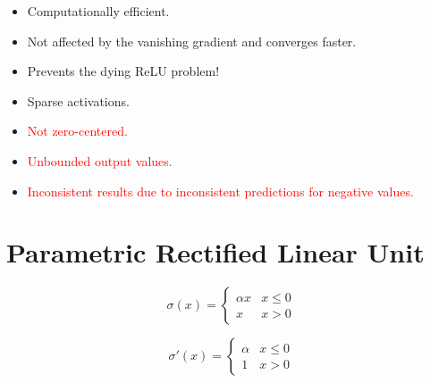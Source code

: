 \documentclass{article}
\begin{document}
\begin{itemize}
  \item Computationally efficient.
  \item Not affected by the vanishing gradient and converges faster.
  \item Prevents the dying ReLU problem!
  \item Sparse activations.
  \item \textcolor{red}{Not zero-centered.}
  \item \textcolor{red}{Unbounded output values.}
  \item \textcolor{red}{Inconsistent results due to inconsistent predictions for negative values.}
\end{itemize}

\clearpage

\section{Parametric Rectified Linear Unit}

\begin{figure}[!htb]
  \centering
\end{figure}

\begin{equation}
  \sigma(x) =
    \begin{cases}
      \alpha x & x \leq 0\\
      x & x > 0
    \end{cases}
\end{equation}

\begin{equation}
  \sigma'(x) =
    \begin{cases}
      \alpha & x \leq 0\\
      1 & x > 0
    \end{cases}
\end{equation}
\end{document}
